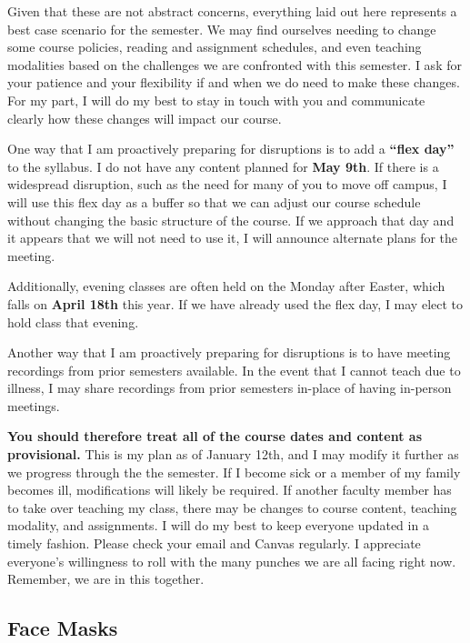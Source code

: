 \documentclass[
]{book}
\begin{document}
Given that these are not abstract concerns, everything laid out here represents a best case scenario for the semester. We may find ourselves needing to change some course policies, reading and assignment schedules, and even teaching modalities based on the challenges we are confronted with this semester. I ask for your patience and your flexibility if and when we do need to make these changes. For my part, I will do my best to stay in touch with you and communicate clearly how these changes will impact our course.

One way that I am proactively preparing for disruptions is to add a \textbf{``flex day''} to the syllabus. I do not have any content planned for \textbf{May 9th}. If there is a widespread disruption, such as the need for many of you to move off campus, I will use this flex day as a buffer so that we can adjust our course schedule without changing the basic structure of the course. If we approach that day and it appears that we will not need to use it, I will announce alternate plans for the meeting.

Additionally, evening classes are often held on the Monday after Easter, which falls on \textbf{April 18th} this year. If we have already used the flex day, I may elect to hold class that evening.

Another way that I am proactively preparing for disruptions is to have meeting recordings from prior semesters available. In the event that I cannot teach due to illness, I may share recordings from prior semesters in-place of having in-person meetings.

\textbf{You should therefore treat all of the course dates and content as provisional.} This is my plan as of January 12th, and I may modify it further as we progress through the the semester. If I become sick or a member of my family becomes ill, modifications will likely be required. If another faculty member has to take over teaching my class, there may be changes to course content, teaching modality, and assignments. I will do my best to keep everyone updated in a timely fashion. Please check your email and Canvas regularly. I appreciate everyone's willingness to roll with the many punches we are all facing right now. Remember, we are in this together.

\hypertarget{face-masks}{%
\subsection{Face Masks}\label{face-masks}}
\end{document}
